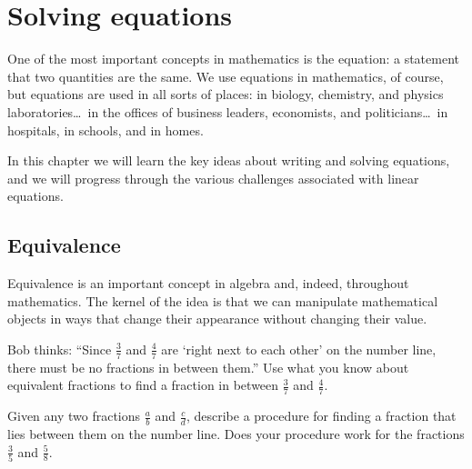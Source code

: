 \chapter{Solving equations}
\label{ch:equations}


One of the most important concepts in mathematics is the equation: a statement that two quantities are the same. We use equations in mathematics, of course, but equations are used in all sorts of places: in biology, chemistry, and physics laboratories\ldots\ in the offices of business leaders, economists, and politicians\ldots\ in hospitals, in schools, and in homes.

In this chapter we will learn the key ideas about writing and solving equations, and we will progress through the various challenges associated with linear equations.

\section{Equivalence}
\label{sec:equivalence}

Equivalence is an important concept in algebra and, indeed, throughout mathematics. The kernel of the idea is that we can manipulate mathematical objects in ways that change their appearance without changing their value.

\begin{boxexplore}
Bob thinks: ``Since $\frac{3}{7}$ and $\frac{4}{7}$ are `right next to each other' on the number line, there must be no fractions in between them.'' Use what you know about equivalent fractions to find a fraction in between $\frac{3}{7}$ and $\frac{4}{7}$.

Given any two fractions $\frac{a}{b}$ and $\frac{c}{d}$, describe a procedure for finding a fraction that lies between them on the number line. Does your procedure work for the fractions $\frac{3}{5}$ and $\frac{5}{8}$.
\end{boxexplore} %



